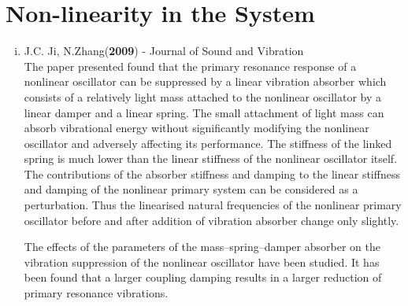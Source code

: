 \section{Non-linearity in the System}
\begin{enumerate}[i)]
\item {J.C. Ji, N.Zhang(\textbf{2009}) - Journal of Sound and Vibration}\\
The paper presented found that the primary resonance response of a nonlinear oscillator can be suppressed by a linear vibration absorber which consists of a relatively light mass attached to the nonlinear oscillator by a linear damper and a linear spring. The small attachment of light mass can absorb vibrational energy without significantly modifying the nonlinear oscillator and adversely affecting its performance. The stiffness of the linked spring is much lower than the linear stiffness of the nonlinear oscillator itself.
The contributions of the absorber stiffness and damping to the linear stiffness and damping of the nonlinear primary system can be considered as a perturbation. Thus the linearised natural frequencies of the nonlinear primary oscillator before and after addition of vibration absorber change only slightly.

The effects of the parameters of the mass–spring–damper absorber on the vibration suppression of the nonlinear oscillator have been studied. It has been found that a larger coupling damping results in a larger reduction of primary resonance vibrations.


\end{enumerate}
